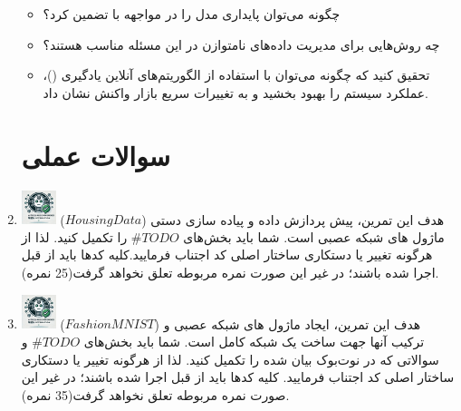 \documentclass[12pt]{article}
\begin{document}
\begin{enumerate}
    \begin{itemize}
        \item چگونه می‌توان پایداری مدل را در مواجهه با  تضمین کرد؟
        \item چه روش‌هایی برای مدیریت داده‌های نامتوازن در این مسئله مناسب هستند؟
        \item تحقیق کنید که چگونه می‌توان با استفاده از الگوریتم‌های آنلاین یادگیری ()، عملکرد سیستم را بهبود بخشید و به تغییرات سریع بازار واکنش نشان داد.
    \end{itemize}
       
    \section*{سوالات عملی} 
    \item \includegraphics[width=1cm]{figs/Allowed_recommended.jpg}
    ($HousingData$) هدف این تمرین، پیش پردازش داده و پیاده سازی دستی ماژول های شبکه عصبی است. شما باید بخش‌های $\#TODO$ را تکمیل کنید. لذا از هرگونه تغییر یا دستکاری ساختار اصلی کد اجتناب فرمایید.کلیه کدها باید از قبل اجرا شده باشند؛ در غیر این صورت نمره مربوطه تعلق نخواهد گرفت(25 نمره).
    
    \item \includegraphics[width=1cm]{figs/Allowed_recommended.jpg}
    ($FashionMNIST$) هدف این تمرین، ایجاد ماژول های شبکه عصبی و ترکیب آنها جهت ساخت یک شبکه کامل است. شما باید بخش‌های $\#TODO$ و سوالاتی که در نوت‌بوک بیان شده را تکمیل کنید. لذا از هرگونه تغییر یا دستکاری ساختار اصلی کد اجتناب فرمایید. کلیه کدها باید از قبل اجرا شده باشند؛ در غیر این صورت نمره مربوطه تعلق نخواهد گرفت(35 نمره).
\end{enumerate}
\end{document}
